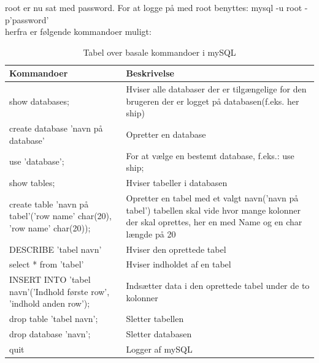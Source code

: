 root er nu sat med password. For at logge på med root benyttes:
mysql -u root -p'password'\\
herfra er følgende kommandoer muligt:
\begin{table}[H]
\begin{tabular}{|p{5cm}|p{10cm}|} \hline
\cellcolor[gray]{0.85}Kommandoer& \cellcolor[gray]{0.85}Beskrivelse  \\ \hline
show databases; & Hviser alle databaser der er tilgængelige for den brugeren der er logget på databasen(f.eks. her ship)   \\ \hline
create database 'navn på database' & Opretter en database   \\ \hline
use 'database'; & For at vælge en bestemt database, f.eks.: use ship;    \\ \hline
show tables; & Hviser tabeller i databasen   \\ \hline
create table 'navn på tabel'('row name' char(20), 'row name' char(20));  & Opretter en tabel med et valgt navn('navn på tabel') tabellen skal vide hvor mange kolonner der skal oprettes, her en med Name og en char længde på 20   \\ \hline
DESCRIBE 'tabel navn' & Hviser den oprettede tabel   \\ \hline
select * from 'tabel' & Hviser indholdet af en tabel   \\ \hline
INSERT INTO 'tabel navn'('Indhold første row', 'indhold anden row');  & Indsætter data i den oprettede tabel under de to kolonner   \\ \hline
drop table 'tabel navn'; & Sletter tabellen\\ \hline
drop database 'navn'; & Sletter databasen\\ \hline
quit & Logger af mySQL\\ \hline
\end{tabular}
\caption{Tabel over basale kommandoer i mySQL}
\label{table:mysqlKommandoer}
\end{table}

